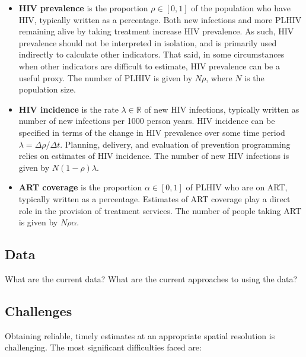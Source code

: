 \documentclass[a4paper, nobind]{templates/ociamthesis}
\providecommand{\tightlist}{%
  \setlength{\itemsep}{0pt}\setlength{\parskip}{0pt}}
\begin{document}
\begin{itemize}
\tightlist
\item
  \textbf{HIV prevalence} is the proportion \(\rho \in [0, 1]\) of the population who have HIV, typically written as a percentage.
  Both new infections and more PLHIV remaining alive by taking treatment increase HIV prevalence.
  As such, HIV prevalence should not be interpreted in isolation, and is primarily used indirectly to calculate other indicators.
  That said, in some circumstances when other indicators are difficult to estimate, HIV prevalence can be a useful proxy.
  The number of PLHIV is given by \(N\rho\), where \(N\) is the population size.
\item
  \textbf{HIV incidence} is the rate \(\lambda \in \mathbb{R}\) of new HIV infections, typically written as number of new infections per 1000 person years.
  HIV incidence can be specified in terms of the change in HIV prevalence over some time period \(\lambda = \Delta \rho / \Delta t\).
  Planning, delivery, and evaluation of prevention programming relies on estimates of HIV incidence.
  The number of new HIV infections is given by \(N (1 - \rho) \lambda\).
\item
  \textbf{ART coverage} is the proportion \(\alpha \in [0, 1]\) of PLHIV who are on ART, typically written as a percentage.
  Estimates of ART coverage play a direct role in the provision of treatment services.
  The number of people taking ART is given by \(N \rho \alpha\).
\end{itemize}

\hypertarget{data}{%
\subsection{Data}\label{data}}

What are the current data?
What are the current approaches to using the data?

\hypertarget{challenges}{%
\subsection{Challenges}\label{challenges}}

Obtaining reliable, timely estimates at an appropriate spatial resolution is challenging.
The most significant difficulties faced are:
\end{document}
